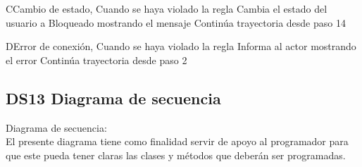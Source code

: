\begin{UCtrayectoriaA}{C}{Cambio de estado,
Cuando se haya violado la regla }
	\UCpaso Cambia el estado del usuario a Bloqueado mostrando el mensaje  
	\UCpaso Continúa trayectoria desde paso 14 
\end{UCtrayectoriaA}

\begin{UCtrayectoriaA}{D}{Error de conexión,
Cuando se haya violado la regla }
	\UCpaso Informa al actor mostrando el error  
	\UCpaso Continúa trayectoria desde paso 2 
\end{UCtrayectoriaA}




\newpage
\subsection{DS13 Diagrama de secuencia}
Diagrama de secuencia:
\\
El presente diagrama tiene como finalidad servir de apoyo al programador para que este pueda tener claras las clases y métodos que deberán ser programadas.
